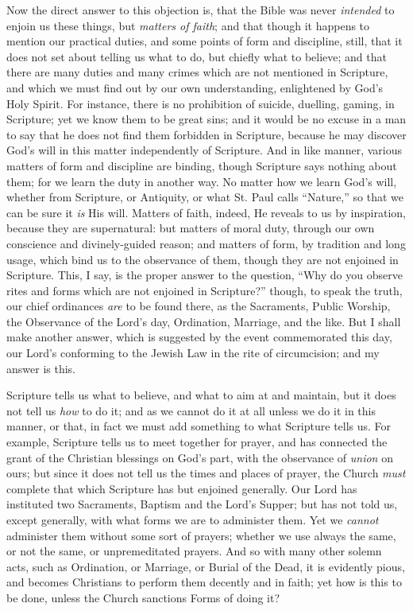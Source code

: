 Now the direct answer to this objection is, that the Bible was
never \emph{intended} to enjoin us these things, but \emph{matters of
faith}; and that though it happens to mention our practical duties,
and some points of form and discipline, still, that it does not set
about telling us what to do, but chiefly what to believe; and that
there are many duties and many crimes which are not mentioned in
Scripture, and which we must find out by our own understanding,
enlightened by God's Holy Spirit. For instance, there is no
prohibition of suicide, duelling, gaming, in Scripture; yet we know
them to be great sins; and it would be no excuse in a man to say that
he does not find them forbidden in Scripture, because he may discover
God's will in this matter independently of Scripture. And in like
manner, various matters of form and discipline are binding, though
Scripture says nothing about them; for we learn the duty in another
way. No matter how we learn God's will, whether from Scripture, or
Antiquity, or what St. Paul calls ``Nature,'' so that we can
be sure it \emph{is} His will. Matters of faith, indeed, He reveals to us by
inspiration, because they are supernatural: but matters of moral duty,
through our own conscience and divinely-guided reason; and matters of
form, by tradition and long usage, which bind us to the observance of
them, though they are not enjoined in Scripture. This, I say, is the
proper answer to the question, ``Why do you observe rites and
forms which are not enjoined in Scripture?'' though, to speak the
truth, our chief ordinances \emph{are} to be found there, as the Sacraments,
Public Worship, the Observance of the Lord's day, Ordination,
Marriage, and the like. But I shall make another answer, which is
suggested by the event commemorated this day, our Lord's conforming to
the Jewish Law in the rite of circumcision; and my answer is this.

Scripture tells us what to believe, and what to aim at and
maintain, but it does not tell us \emph{how} to do it; and as we cannot do it
at all unless we do it in this manner, or that, in fact we must add
something to what Scripture tells us. For example, Scripture tells us
to meet together for prayer, and has connected the grant of the
Christian blessings on God's part, with the observance of \emph{union}
on ours; but since it does not tell us the times and places of prayer,
the Church \emph{must} complete that which Scripture has but enjoined
generally. Our Lord has instituted two Sacraments, Baptism and the
Lord's Supper; but has not told us, except generally, with what forms
we are to administer them. Yet we \emph{cannot} administer them without some
sort of prayers; whether we use always the same, or not the same, or
unpremeditated prayers. And so with many other solemn acts, such as
Ordination, or Marriage, or Burial of the Dead, it is evidently pious,
and becomes Christians to perform them decently and in faith; yet how
is this to be done, unless the Church sanctions Forms of doing it?

